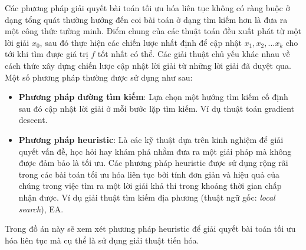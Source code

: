     Các phương pháp giải quyết bài toán tối ưu hóa liên tục không có ràng buộc
    ở dạng tổng quát thường hướng đến coi bài toán ở dạng tìm kiếm hơn là đưa ra
    một công thức tường minh. Điểm chung của các thuật toán đều xuất phát từ một lời giải $x_0$, sau đó thực hiện các chiến lược nhất định để cập nhật $x_1, x_2, ...x_k$ cho tới khi tìm được giá trị $f$ tốt nhất có thể. 
    Các giải thuật chủ yếu khác nhau
    về cách thức xây dựng chiến lược cập nhật lời giải từ những lời giải đã duyệt qua. Một số phương pháp thường được sử dụng như sau:
    \begin{itemize}
        \item \textbf{Phương pháp đường tìm kiếm}: Lựa chọn một hướng tìm kiếm cố định sau đó cập nhật lời giải ở mỗi bước lặp tìm kiếm. Ví dụ thuật toán gradient descent.
        \item \textbf{Phương pháp heuristic}: Là các kỹ thuật dựa trên kinh nghiệm để giải quyết vấn đề, học hỏi hay khám phá nhằm đưa ra một giải pháp mà không được đảm bảo là tối ưu. Các phương pháp heuristic được sử dụng rộng rãi trong các bài toán tối ưu hóa liên tục bởi tính đơn giản và hiệu quả của chúng trong việc tìm ra một lời giải khả thi trong khoảng thời gian chấp nhận được. Ví dụ giải thuật tìm kiếm địa phương (thuật ngữ gốc: \emph{local search}), EA.
    \end{itemize}
    Trong đồ án này sẽ xem xét phương pháp heuristic để giải quyết bài toán tối ưu hóa liên tục mà cụ thể là sử dụng giải thuật tiến hóa. 
